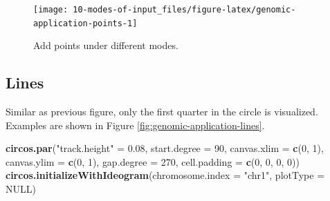 \documentclass[]{book}
\newenvironment{Shaded}{\begin{snugshade}}{\end{snugshade}}
\newcommand{\KeywordTok}[1]{\textcolor[rgb]{0.13,0.29,0.53}{\textbf{#1}}}
\newcommand{\DataTypeTok}[1]{\textcolor[rgb]{0.13,0.29,0.53}{#1}}
\newcommand{\DecValTok}[1]{\textcolor[rgb]{0.00,0.00,0.81}{#1}}
\newcommand{\FloatTok}[1]{\textcolor[rgb]{0.00,0.00,0.81}{#1}}
\newcommand{\StringTok}[1]{\textcolor[rgb]{0.31,0.60,0.02}{#1}}
\newcommand{\OtherTok}[1]{\textcolor[rgb]{0.56,0.35,0.01}{#1}}
\newcommand{\ControlFlowTok}[1]{\textcolor[rgb]{0.13,0.29,0.53}{\textbf{#1}}}
\newcommand{\OperatorTok}[1]{\textcolor[rgb]{0.81,0.36,0.00}{\textbf{#1}}}
\newcommand{\NormalTok}[1]{#1}
\theoremstyle{definition}
\theoremstyle{definition}
\theoremstyle{remark}
\begin{document}
\begin{Shaded}
\end{Shaded}

\begin{figure}

{\centering \texttt{[image: 10-modes-of-input\_files/figure-latex/genomic-application-points-1]} 

}

\caption{Add points under different modes.}\label{fig:genomic-application-points}
\end{figure}

\subsection{Lines}\label{modes-lines}

Similar as previous figure, only the first quarter in the circle is
visualized. Examples are shown in Figure
\ref{fig:genomic-application-lines}.

\begin{Shaded}
\begin{Highlighting}[]
\KeywordTok{circos.par}\NormalTok{(}\StringTok{"track.height"}\NormalTok{ =}\StringTok{ }\FloatTok{0.08}\NormalTok{, }\DataTypeTok{start.degree =} \DecValTok{90}\NormalTok{,}
    \DataTypeTok{canvas.xlim =} \KeywordTok{c}\NormalTok{(}\DecValTok{0}\NormalTok{, }\DecValTok{1}\NormalTok{), }\DataTypeTok{canvas.ylim =} \KeywordTok{c}\NormalTok{(}\DecValTok{0}\NormalTok{, }\DecValTok{1}\NormalTok{), }\DataTypeTok{gap.degree =} \DecValTok{270}\NormalTok{,}
    \DataTypeTok{cell.padding =} \KeywordTok{c}\NormalTok{(}\DecValTok{0}\NormalTok{, }\DecValTok{0}\NormalTok{, }\DecValTok{0}\NormalTok{, }\DecValTok{0}\NormalTok{))}
\KeywordTok{circos.initializeWithIdeogram}\NormalTok{(}\DataTypeTok{chromosome.index =} \StringTok{"chr1"}\NormalTok{, }\DataTypeTok{plotType =} \OtherTok{NULL}\NormalTok{)}
\end{Highlighting}
\end{Shaded}
\end{document}
